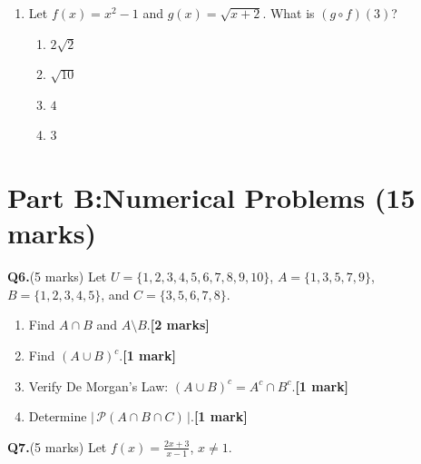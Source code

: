 \documentclass[11pt]{article}
\begin{document}
\begin{enumerate}[label=\textbf{Q\arabic*.},leftmargin=2.5em,itemsep=1.6em]
\item Let $f(x) = x^{2} - 1$ and $g(x) = \sqrt{x+2}$. What is $(g \circ f)(3)$?

\medskip
\begin{enumerate}[label=\textbf{(\Alph*)},leftmargin=2em,itemsep=0.4em]
  \item $2\sqrt{2}$
  \item $\sqrt{10}$
  \item $4$
  \item $3$
\end{enumerate}

\end{enumerate}

\bigskip

\section{Part B:\enspace Numerical Problems\quad\normalfont\small
         (15 marks)}

\bigskip

\noindent\textbf{Q6.}\quad(5 marks)\enspace
Let $U = \{1,2,3,4,5,6,7,8,9,10\}$, $A = \{1,3,5,7,9\}$,
$B = \{1,2,3,4,5\}$, and $C = \{3,5,6,7,8\}$.

\medskip
\begin{enumerate}[label=\textbf{(\alph*)},leftmargin=2em,itemsep=1.5em]
  \item Find $A \cap B$ and $A \setminus B$.\hfill\textbf{[2 marks]}

        

  \item Find $(A \cup B)^{c}$.\hfill\textbf{[1 mark]}

         

  \item Verify De Morgan's Law: $(A \cup B)^{c} = A^{c} \cap B^{c}$.\hfill\textbf{[1 mark]}

      

  \item Determine $\bigl|\,\mathcal{P}(A \cap B \cap C)\,\bigr|$.\hfill\textbf{[1 mark]}

         
\end{enumerate}

\bigskip

\noindent\textbf{Q7.}\quad(5 marks)\enspace
Let $\displaystyle f(x) = \frac{2x+3}{x-1}$, \; $x \neq 1$.
\end{document}
